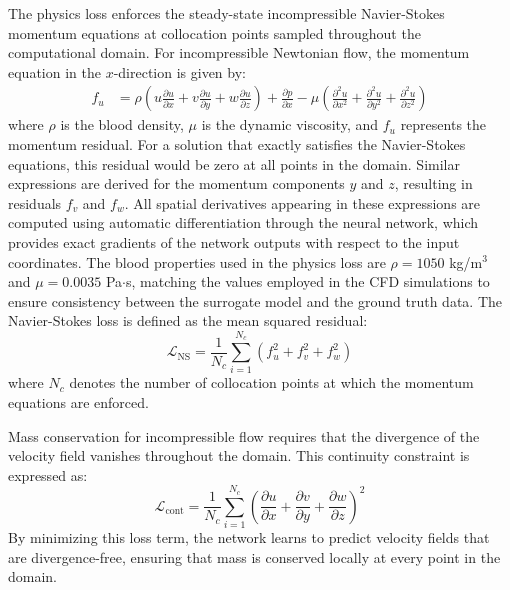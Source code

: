 ﻿\documentclass[12pt,a4paper]{article}
\theoremstyle{definition}
\numberwithin{equation}{section}
\begin{document}
{The physics loss enforces the steady-state incompressible Navier-Stokes momentum equations at collocation points sampled throughout the computational domain. For incompressible Newtonian flow, the momentum equation in the $x$-direction is given by:
\begin{align}
    f_u &= \rho\left(u\frac{\partial u}{\partial x} + v\frac{\partial u}{\partial y} + w\frac{\partial u}{\partial z}\right) + \frac{\partial p}{\partial x} - \mu\left(\frac{\partial^2 u}{\partial x^2} + \frac{\partial^2 u}{\partial y^2} + \frac{\partial^2 u}{\partial z^2}\right)
\end{align}
where $\rho$ is the blood density, $\mu$ is the dynamic viscosity, and $f_u$ represents the momentum residual. For a solution that exactly satisfies the Navier-Stokes equations, this residual would be zero at all points in the domain. Similar expressions are derived for the momentum components $y$ and $z$, resulting in residuals $f_v$ and $f_w$. All spatial derivatives appearing in these expressions are computed using automatic differentiation through the neural network, which provides exact gradients of the network outputs with respect to the input coordinates. The blood properties used in the physics loss are $\rho = {1050}$ kg/m$^3$ and $\mu = 0.0035$ Pa$\cdot$s, matching the values employed in the CFD simulations to ensure consistency between the surrogate model and the ground truth data. The Navier-Stokes loss is defined as the mean squared residual:
\begin{equation}
    \mathcal{L}_{\text{NS}} = \frac{1}{N_c} \sum_{i=1}^{N_c} \left( f_u^2 + f_v^2 + f_w^2 \right)
\end{equation}
where $N_c$ denotes the number of collocation points at which the momentum equations are enforced.

Mass conservation for incompressible flow requires that the divergence of the velocity field vanishes throughout the domain. This continuity constraint is expressed as:
\begin{equation}
    \mathcal{L}_{\text{cont}} = \frac{1}{N_c} \sum_{i=1}^{N_c} \left( \frac{\partial u}{\partial x} + \frac{\partial v}{\partial y} + \frac{\partial w}{\partial z} \right)^2
\end{equation}
By minimizing this loss term, the network learns to predict velocity fields that are divergence-free, ensuring that mass is conserved locally at every point in the domain.

}
\end{document}
